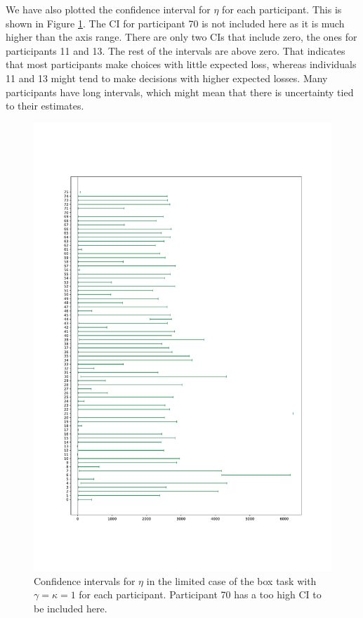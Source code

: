 We have also plotted the confidence interval for $\eta$ for each participant. This is shown in Figure \ref{fig:all_cis_eta_lim}. The CI for participant 70 is not included here as it is much higher than the axis range. There are only two CIs that include zero, the ones for participants 11 and 13. The rest of the intervals are above zero. That indicates that most participants make choices with little expected loss, whereas individuals 11 and 13 might tend to make decisions with higher expected losses. Many participants have long intervals, which might mean that there is uncertainty tied to their estimates. 
\begin{figure}
    \centering
    \includegraphics[scale=0.37]{pictures/all_cis_lim_eta_pdf.pdf}
    \caption[CIs for $\eta$, limited. $\gamma=\kappa=1$]{Confidence intervals for $\eta$ in the limited case of the box task with $\gamma=\kappa=1$ for each participant. Participant 70 has a too high CI to be included here.}
    \label{fig:all_cis_eta_lim}
\end{figure}


